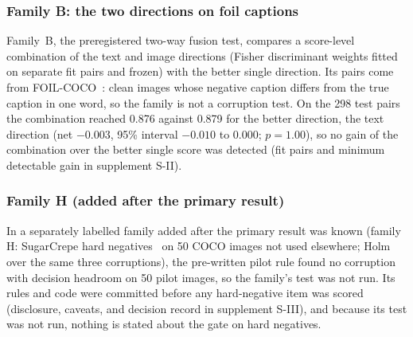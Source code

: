 \subsubsection{Family B: the two directions on foil captions}
Family~B, the preregistered two-way fusion test, compares a score-level combination of the text and image directions (Fisher
discriminant weights fitted on separate fit pairs and frozen) with the better single direction.
Its pairs come from FOIL-COCO~\cite{shekhar2017foil}: clean images whose negative caption differs from the true caption in one word, so the family
is not a corruption test.
On the 298 test pairs the combination reached 0.876 against 0.879 for the better direction, the text direction (net $-0.003$, 95\%
interval $-0.010$ to $0.000$; $p=1.00$), so no gain of the combination over the better single score was detected (fit pairs and
minimum detectable gain in supplement S-II).

\subsubsection{Family H (added after the primary result)}\label{sec:study1-H}
In a separately labelled family added after the primary result was known (family H: SugarCrepe hard
negatives~\cite{hsieh2023sugarcrepe} on 50 COCO images not used elsewhere; Holm over the
same three corruptions), the pre-written pilot rule found no corruption with decision headroom on 50 pilot images, so the family's test
was not run.
Its rules and code were committed before any hard-negative item was scored (disclosure, caveats, and decision record in supplement
S-III), and because its test was not run, nothing is stated about the gate on hard negatives.

